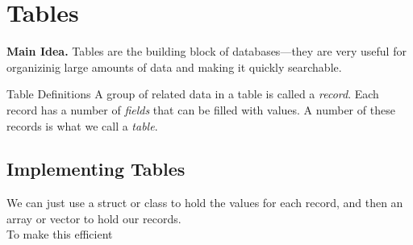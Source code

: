 \documentclass[class=article, crop=false]{standalone}
\begin{document}
  \section{Tables}
  \textbf{Main Idea.} Tables are the building block of databases---they are very useful for organizinig large amounts of data and making it quickly searchable.
  \begin{definition}{Table Definitions}
    A group of related data in a table is called a \emph{record}. Each record has a number of \emph{fields} that can be filled with values. A number of these records is what we call a \emph{table}.
  \end{definition}
  \subsection{Implementing Tables}
  We can just use a struct or class to hold the values for each record, and then an array or vector to hold our records. \\[10pt]
  To make this efficient
\end{document}
